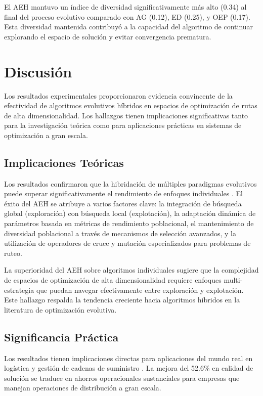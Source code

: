 \documentclass[12pt,a4paper]{article}
\begin{document}
El AEH mantuvo un índice de diversidad significativamente más alto (0.34) al final del proceso evolutivo comparado con AG (0.12), ED (0.25), y OEP (0.17). Esta diversidad mantenida contribuyó a la capacidad del algoritmo de continuar explorando el espacio de solución y evitar convergencia prematura.

\section{Discusión}

Los resultados experimentales proporcionaron evidencia convincente de la efectividad de algoritmos evolutivos híbridos en espacios de optimización de rutas de alta dimensionalidad. Los hallazgos tienen implicaciones significativas tanto para la investigación teórica como para aplicaciones prácticas en sistemas de optimización a gran escala.

\subsection{Implicaciones Teóricas}

Los resultados confirmaron que la hibridación de múltiples paradigmas evolutivos puede superar significativamente el rendimiento de enfoques individuales \cite{davis1991,michalewicz1996}. El éxito del AEH se atribuye a varios factores clave: la integración de búsqueda global (exploración) con búsqueda local (explotación), la adaptación dinámica de parámetros basada en métricas de rendimiento poblacional, el mantenimiento de diversidad poblacional a través de mecanismos de selección avanzados, y la utilización de operadores de cruce y mutación especializados para problemas de ruteo.

La superioridad del AEH sobre algoritmos individuales sugiere que la complejidad de espacios de optimización de alta dimensionalidad requiere enfoques multi-estrategia que puedan navegar efectivamente entre exploración y explotación. Este hallazgo respalda la tendencia creciente hacia algoritmos híbridos en la literatura de optimización evolutiva.

\subsection{Significancia Práctica}

Los resultados tienen implicaciones directas para aplicaciones del mundo real en logística y gestión de cadenas de suministro \cite{clarke1964}. La mejora del 52.6\% en calidad de solución se traduce en ahorros operacionales sustanciales para empresas que manejan operaciones de distribución a gran escala.
\end{document}
